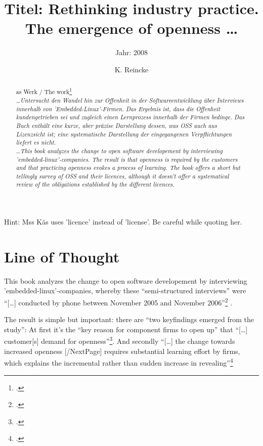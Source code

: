 \documentclass[DIV=calc,BCOR=5mm,11pt,headings=small,oneside,abstract=true, toc=bib]{scrartcl}
\begin{document}

\titlehead{Literaturexzerpt}
\subject{Autor(en): Käs}
\title{Titel: Rethinking industry practice. The emergence of openness \ldots}
\subtitle{Jahr: 2008}
\author{K. Reincke}

\maketitle

\begin{abstract}
\noindent
as Werk / The work\footcite[][]{Kaes2008a} \\
\noindent \itshape
\ldots Untersucht den Wandel hin zur Offenheit in der Softwareentwicklung über
Interviews innerhalb von 'Embedded-Linux'-Firmen. Das Ergebnis ist, dass die
Offenheit kundengetrieben sei und zugleich einen Lernprozess innerhalb der
Firmen bedinge. Das Buch enthält eine kurze, aber präzise Darstellung dessen,
was OSS auch aus Lizenzsicht ist; eine systematische Darstellung der
eingegangenen Verpflichtungen liefert es nicht.\\
\noindent
\ldots This book analyzes the change to open software developement by
interviewing 'embedded-linux'-companies. The result is that openness is required by the
customers and that practicing openness evokes a process of learning. The book
offers a short but tellingly survey of OSS and their licences, although it
doesn't offer a systematical review of the obligations established by the
different licences.
\end{abstract}
\footnotesize
\normalsize

Hint: Mss Käs uses 'licence' instead of 'license'. Be careful while quoting her.
\section{Line of Thought}

This book analyzes the change to open software developement by
interviewing 'embedded-linux'-companies, whereby these
\enquote{semi-structured interviews} were \enquote{[\ldots] conducted
by phone between November 2005 and November
2006}\footcite[cf][100f]{Kaes2008a} . 

The result is simple but important: there are \enquote{two keyfindings emerged
from the study}: At first it's the \enquote{key reason for component firms
to open up} that \enquote{[\ldots] customer[s] demand for
openness}\footcite[cf.][212]{Kaes2008a}. And secondly \enquote{[\ldots] the
change towards increased openness [/NextPage] requires substantial learning
effort by firms, which explains the incremental rather than sudden increase in
revealing}\footcite[cf.][212f]{Kaes2008a}
\end{document}
